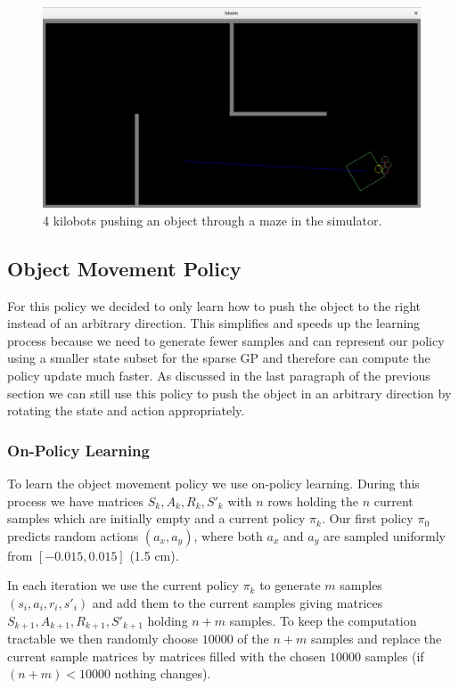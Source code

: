 \documentclass[twoside]{article}
\begin{document}
\begin{figure}[!htb]
    \centering
    \includegraphics[width=0.9\linewidth]{figures/simulator_maze.png}
    \caption{4 kilobots pushing an object through a maze in the simulator.}
    \label{fig:simulator}
\end{figure}

\subsection{Object Movement Policy}
\label{sec:objpolicy}

For this policy we decided to only learn how to push the object to the right
instead of an arbitrary direction. This simplifies and speeds up the learning
process because we need to generate fewer samples and can represent our policy
using a smaller state subset for the sparse GP and therefore can compute the
policy update much faster. As discussed in the last paragraph of the previous
section we can still use this policy to push the object in an arbitrary
direction by rotating the state and action appropriately.

\subsubsection{On-Policy Learning}

To learn the object movement policy we use on-policy learning. During this
process we have matrices $S_k, A_k, R_k, S'_k$ with $n$ rows holding the $n$
current samples which are initially empty and a current policy $\pi_k$. Our
first policy $\pi_0$ predicts random actions $(a_x, a_y)$, where both $a_x$ and
$a_y$ are sampled uniformly from $[-0.015, 0.015]$ (1.5 cm).

In each iteration we use the current policy $\pi_k$ to generate $m$ samples
$(s_i, a_i, r_i, s'_i)$ and add them to the current samples giving matrices
$S_{k+1}, A_{k+1}, R_{k+1}, S'_{k+1}$ holding $n + m$ samples. To keep the
computation tractable we then randomly choose $10000$ of the $n + m$ samples
and replace the current sample matrices by matrices filled with the chosen
$10000$ samples (if $(n + m) < 10000$ nothing changes).
\end{document}
